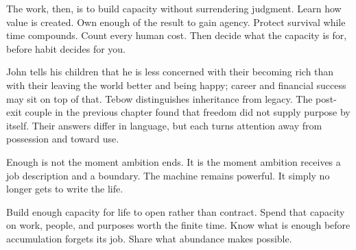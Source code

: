 The work, then, is to build capacity without surrendering judgment. Learn how
value is created. Own enough of the result to gain agency. Protect survival
while time compounds. Count every human cost. Then decide what the capacity
is for, before habit decides for you.

John tells his children that he is less concerned with their becoming rich
than with their leaving the world better and being happy; career and financial
success may sit on top of that. Tebow distinguishes inheritance from legacy.
The post-exit couple in the previous chapter found that freedom did not supply
purpose by itself. Their answers differ in language, but each turns attention
away from possession and toward use.

Enough is not the moment ambition ends. It is the moment ambition receives a
job description and a boundary. The machine remains powerful. It simply no
longer gets to write the life.

Build enough capacity for life to open rather than contract. Spend that
capacity on work, people, and purposes worth the finite time. Know what is
enough before accumulation forgets its job. Share what abundance makes
possible.

